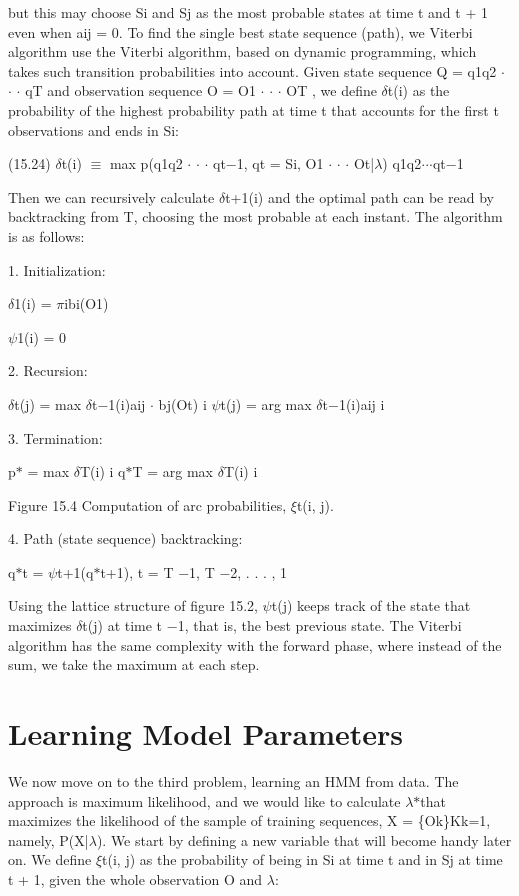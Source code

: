 but this may choose Si and Sj as the most probable states at time t and t + 1 even when aij = 0. To find the single best state sequence (path), we Viterbi algorithm use the Viterbi algorithm, based on dynamic programming, which takes such transition probabilities into account. Given state sequence Q = q1q2 $\cdot$ $\cdot$ $\cdot$ qT and observation sequence O = O1 $\cdot$ $\cdot$ $\cdot$ OT , we define $\delta$t(i) as the probability of the highest probability path at time t that accounts for the first t observations and ends in Si:

(15.24) $\delta$t(i) $\equiv$ max p(q1q2 $\cdot$ $\cdot$ $\cdot$ qt$-$1, qt = Si, O1 $\cdot$ $\cdot$ $\cdot$ Ot|$\lambda$) q1q2$\cdot$$\cdot$$\cdot$qt$-$1

Then we can recursively calculate $\delta$t+1(i) and the optimal path can be read by backtracking from T, choosing the most probable at each instant. The algorithm is as follows:

1. Initialization:

$\delta$1(i) = $\pi$ibi(O1)

$\psi$1(i) = 0

2. Recursion:

$\delta$t(j) = max $\delta$t$-$1(i)aij $\cdot$ bj(Ot) i $\psi$t(j) = arg max $\delta$t$-$1(i)aij i

3. Termination:

p$*$ = max $\delta$T(i) i q$*$T = arg max $\delta$T(i) i

Figure 15.4 Computation of arc probabilities, $\xi$t(i, j).

4. Path (state sequence) backtracking:

q$*$t = $\psi$t+1(q$*$t+1), t = T $-$1, T $-$2, . . . , 1

Using the lattice structure of figure 15.2, $\psi$t(j) keeps track of the state that maximizes $\delta$t(j) at time t $-$1, that is, the best previous state. The Viterbi algorithm has the same complexity with the forward phase, where instead of the sum, we take the maximum at each step.

\section{Learning Model Parameters}

We now move on to the third problem, learning an HMM from data. The approach is maximum likelihood, and we would like to calculate $\lambda$$*$that maximizes the likelihood of the sample of training sequences, X = \{Ok\}Kk=1, namely, P(X|$\lambda$). We start by defining a new variable that will become handy later on. We define $\xi$t(i, j) as the probability of being in Si at time t and in Sj at time t + 1, given the whole observation O and $\lambda$:

